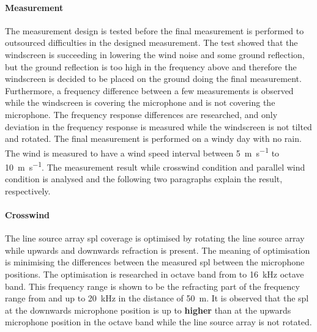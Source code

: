 \paragraph{Measurement}
The measurement design is tested before the final measurement is performed to outsourced difficulties in the designed measurement. The test showed that the windscreen is succeeding in lowering the wind noise and some ground reflection, but the ground reflection is too high in the frequency above  and therefore the windscreen is decided to be placed on the ground doing the final measurement. Furthermore, a frequency difference between a few measurements is observed while the windscreen is covering the microphone and is not covering the microphone. The frequency response differences are researched, and only  deviation in the frequency response is measured while the windscreen is not tilted and rotated.  The final measurement is performed on a windy day with no rain. The wind is measured to have a wind speed interval between \SI{5}{\meter\per\second} to \SI{10}{\meter\per\second}. The measurement result while crosswind condition and parallel wind condition is analysed and the following two paragraphs explain the result, respectively.



\paragraph{Crosswind}
The line source array \gls{spl} coverage is optimised by rotating the line source array while upwards and downwards refraction is present. The meaning of optimisation is minimising the differences between the measured \gls{spl} between the microphone positions. The optimisation is researched in octave band from  to \SI{16}{\kilo\hertz} octave band. This frequency range is shown to be the refracting part of the frequency range from  and up to \SI{20}{\kilo\hertz} in the distance of \SI{50}{\meter}. It is observed that the \gls{spl} at the downwards microphone position is up to\textbf{  higher} than at the upwards microphone position in the  octave band while the line source array is not rotated. 

